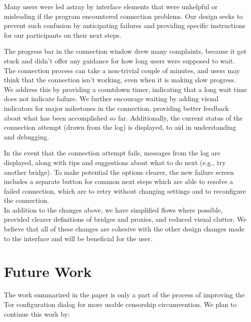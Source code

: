 \documentclass{template}
\begin{document}

Many users were led astray by interface elements that were unhelpful or
misleading if the program encountered connection problems. Our design seeks to
prevent such confusion by anticipating failures and providing specific instructions
for our participants on their next steps.

The progress bar in the connection window drew many complaints, because it got
stuck and didn't offer any guidance for how long users were supposed to wait. 
The connection process can take a non-trivial couple of minutes, and users may
think that the connection isn't working, even when it is making slow progress. We
address this by providing a countdown timer, indicating that a long wait time does
not indicate failure. We further encourage waiting by adding visual indicators
for major milestones in the connection, providing better feedback about what has
been accomplished so far. Additionally, the current status of the connection
attempt (drawn from the log) is displayed, to aid in understanding and
debugging.

In the event that the connection attempt fails, messages from the log are
displayed, along with tips and suggestions about what to do next (e.g., try
another bridge). To make potential the options clearer, the new failure screen
includes a separate button for common next steps which are able to resolve
a failed connection, which are to retry without changing settings and to reconfigure 
the connection. \\

In addition to the changes above, we have simplified flows where possible,
provided clearer definitions of bridges and proxies, and reduced visual clutter.
We believe that all of these changes are cohesive with the other design changes
made to the interface and will be beneficial for the user.

\section{Future Work}

The work summarized in the paper is only a part of the process of improving the Tor configuration
dialog for more usable censorship circumvention. We plan to continue this work by:
\end{document}
